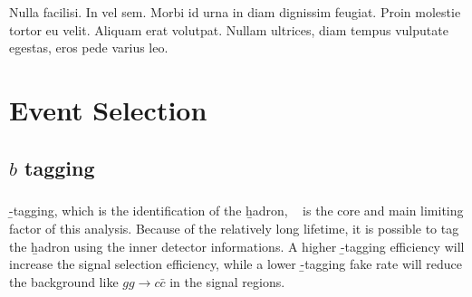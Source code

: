 \begin{savequote}[75mm]
Nulla facilisi. In vel sem. Morbi id urna in diam dignissim feugiat. Proin molestie tortor eu velit. Aliquam erat volutpat. Nullam ultrices, diam tempus vulputate egestas, eros pede varius leo.
\end{savequote}

\chapter{Event Selection}

\section{$b$ tagging}
\paragraph{}
\b-tagging, which is the identification of the \b hadron,  ~\cite{Reco-btag-2016} is the core and main limiting factor of this analysis. Because of the relatively long lifetime, it is possible to tag the \b hadron using the inner detector informations. A higher \b-tagging efficiency will increase the signal selection efficiency, while a lower \b-tagging fake rate will reduce the background like $gg \to c\bar{c}$ in the signal regions.